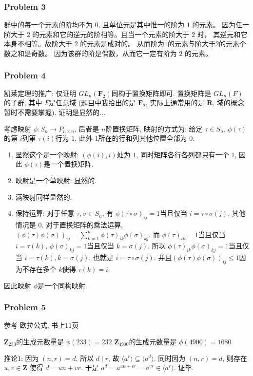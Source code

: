 \documentclass[a4paper,12pt]{ctexart}
\newcommand{\Z}{\mathbf{Z}}
\newcommand{\F}{\mathbf{F}}
\newcommand{\R}{\mathbf{R}}
\begin{document}
\subsubsection*{Problem 3}
群中的每一个元素的阶均不为 $ 0 $, 且单位元是其中惟一的阶为 $1$ 的元素。
因为任一阶大于 $2$ 的元素和它的逆元的阶相等。且当一个元素的阶大于 $2$ 时，
其逆元和它本身不相等。故阶大于 $2$ 的元素是成对的。
从而阶为$1$的元素与阶大于$2$的元素个数之和是奇数。
因为该群的阶是偶数，从而它一定有阶为 $2$ 的元素。
\subsubsection*{Problem 4}
    凯莱定理的推广: 仅证明 $ GL_n(\F_2) $同构于置换矩阵即可. 置换矩阵是 $ GL_n(F) $的子群, 其中 $ F $是任意域 (题目中我给出的是 $ \F_2 $, 实际上通常用的是 $ \R $, 域的概念暂时不需要掌握). 证明是显然的...

    考虑映射 $ \phi:S_n\rightarrow P_{n\times n} $, 后者是 $ n $阶置换矩阵, 
    映射的方式为: 给定 $ \tau\in S_n $, $ \phi(\tau) $的第 $ i $列第 $ \tau(i) $行为 $ 1 $, 此外 $ 1 $所在的行和列其他位置全部为 $ 0 $.
    \begin{enumerate}
      \item 显然这个是一个映射: $ (\phi(i),i) $处为 $ 1 $, 同时矩阵各行各列都只有一个 $ 1 $, 因此 $ \phi(\tau) $是一个置换矩阵.
      \item 映射是一个单映射: 显然的.
      \item 满映射同样显然的.
      \item 保持运算: 对于任意 $ \tau,\sigma\in S_n $, 
      有 $ \phi(\tau\circ\sigma)_{ij}=1 $当且仅当 $ i=\tau\circ\sigma(j) $, 其他情况是 $ 0 $. 对于置换矩阵的乘法运算, $ (\phi(\tau)\phi(\sigma))_{ij}=\sum_{k=1}^n\phi(\tau)_{ik}\phi(\sigma)_{kj} $. 而 $ \phi(\tau)_{ik}=1 $当且仅当 $ i=\tau(k) $, $ \phi(\sigma)_{kj}=1 $当且仅当 $ k=\sigma(j) $. 所以 $ \phi(\tau)_{ik}\phi(\sigma)_{kj}=1$当且仅当 $ i=\tau(k),k=\sigma(j) $, 也就是 $ i=\tau\circ\sigma(j) $. 并且$ (\phi(\tau)\phi(\sigma))_{ij}\leq 1 $因为不存在多个 $ k $使得 $ \tau(k)=i $.
    \end{enumerate}
    因此映射 $ \phi $是一个同构映射.    
\subsubsection*{Problem 5}
    参考 欧拉公式, 书上11页

    $ \Z_233 $的生成元数量是 $ \phi(233)=232 $
    $ \Z_4900 $的生成元数量是 $ \phi(4900)=1680 $
    
    推论1: 因为 $ (n,r)=d $, 所以 $ d\mid r $, 故 $ \langle a^r\rangle\subseteq\langle a^d\rangle $. 同时因为 $ (n,r)=d $, 则存在 $ u,v\in\Z $ 使得 $ d=un+vr $. 于是 $ a^d=a^{un+vr}=a^{vr}\in\langle a^r\rangle $. 证毕.
\end{document}
